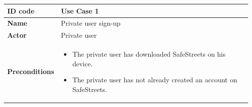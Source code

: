 \documentclass[titlepage]{article}
\begin{document}
\begin{longtable}{| p{3 cm} | p{10 cm} |} 
\hline



\textbf{ID code}   & Use Case 1\\ \hline
\textbf{Name}	& Private user sign-up \\ \hline
\textbf{Actor}     & Private user	 \\ \hline
\textbf{Preconditions} & 
\begin{itemize}
	\item The private user has downloaded SafeStreets on his device. 
	\item The private user has not already created an account on SafeStreets.
\end{itemize} 
     \\ \hline
     

\end{longtable}
\end{document}
